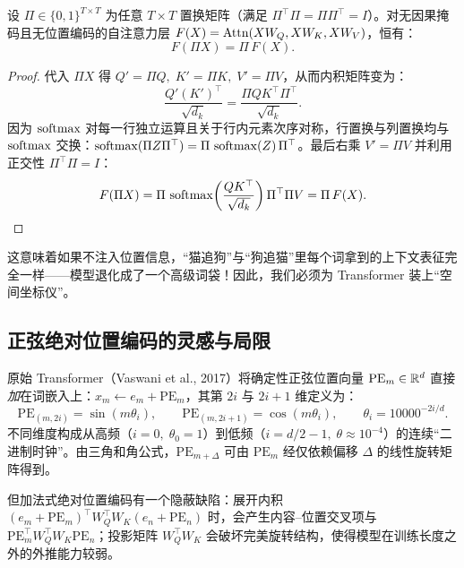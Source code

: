 \begin{thmBox}
\begin{proposition}[无位置编码自注意力的置换等变性]
\label{prop:attn-perm}
设 $\Pi \in \{0, 1\}^{T \times T}$ 为任意 $T \times T$ 置换矩阵（满足 $\Pi^\top \Pi = \Pi \Pi^\top = I$）。对无因果掩码且无位置编码的自注意力层 $F(X) = \operatorname{Attn}(X W_Q, X W_K, X W_V)$，恒有：
\begin{equation}
  F(\Pi X) = \Pi\, F(X).
  \label{eq:attn-perm}
\end{equation}
\end{proposition}
\begin{proof}
代入 $\Pi X$ 得 $Q' = \Pi Q,\; K' = \Pi K,\; V' = \Pi V$，从而内积矩阵变为：
\[
  \frac{Q' (K')^\top}{\sqrt{d_k}} = \frac{\Pi Q K^\top \Pi^\top}{\sqrt{d_k}}.
\]
因为 $\operatorname{softmax}$ 对每一行独立运算且关于行内元素次序对称，行置换与列置换均与 $\operatorname{softmax}$ 交换：$\operatorname{softmax}(\Pi Z \Pi^\top) = \Pi\,\operatorname{softmax}(Z)\,\Pi^\top$。最后右乘 $V' = \Pi V$ 并利用正交性 $\Pi^\top \Pi = I$：
\[
  F(\Pi X) = \Pi\,\operatorname{softmax}\!\left(\frac{Q K^\top}{\sqrt{d_k}}\right)\Pi^\top \Pi V = \Pi\, F(X).
\]
\end{proof}
\end{thmBox}

这意味着如果不注入位置信息，“猫追狗”与“狗追猫”里每个词拿到的上下文表征完全一样——模型退化成了一个高级词袋！因此，我们必须为 Transformer 装上“空间坐标仪”。

\subsection{正弦绝对位置编码的灵感与局限}

原始 Transformer（Vaswani et al., 2017）将确定性正弦位置向量 $\mathrm{PE}_m \in \mathbb{R}^d$ 直接\emph{加}在词嵌入上：$x_m \leftarrow e_m + \mathrm{PE}_m$，其第 $2i$ 与 $2i+1$ 维定义为：
\begin{equation}
  \mathrm{PE}_{(m, 2i)} = \sin(m \theta_i), \qquad
  \mathrm{PE}_{(m, 2i+1)} = \cos(m \theta_i), \qquad
  \theta_i = 10000^{-2i/d}.
  \label{eq:sin-pe}
\end{equation}
不同维度构成从高频（$i=0,\; \theta_0 = 1$）到低频（$i=d/2-1,\; \theta \approx 10^{-4}$）的连续“二进制时钟”。由三角和角公式，$\mathrm{PE}_{m+\Delta}$ 可由 $\mathrm{PE}_m$ 经仅依赖偏移 $\Delta$ 的线性旋转矩阵得到。

但加法式绝对位置编码有一个隐蔽缺陷：展开内积 $(e_m + \mathrm{PE}_m)^\top W_Q^\top W_K (e_n + \mathrm{PE}_n)$ 时，会产生内容--位置交叉项与 $\mathrm{PE}_m^\top W_Q^\top W_K \mathrm{PE}_n$；投影矩阵 $W_Q^\top W_K$ 会破坏完美旋转结构，使得模型在训练长度之外的外推能力较弱。

